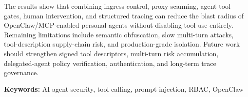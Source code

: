 \documentclass[UTF8,zihao=-4,scheme=chinese,fontset=none]{ctexart}
\newenvironment{enabstract}{\rmfamily}{\par}
\newcommand{\keywordspace}{\vspace{1\baselineskip}\noindent}
\begin{document}
\begin{enabstract}
The results show that combining ingress control, proxy scanning, agent tool gates, human intervention, and structured tracing can reduce the blast radius of OpenClaw/MCP-enabled personal agents without disabling tool use entirely. Remaining limitations include semantic obfuscation, slow multi-turn attacks, tool-description supply-chain risk, and production-grade isolation. Future work should strengthen signed tool descriptors, multi-turn risk accumulation, delegated-agent policy verification, authentication, and long-term trace governance.
\end{enabstract}

\keywordspace\textbf{Keywords:} AI agent security, tool calling, prompt injection, RBAC, OpenClaw

\clearpage
\tableofcontents

\vspace{0.5\baselineskip}
\end{document}
